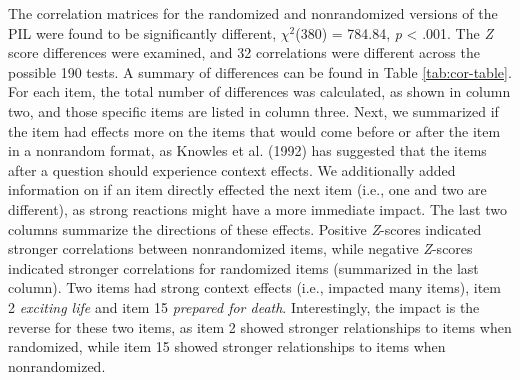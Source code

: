 \documentclass[english,man, mask]{apa6}
\theoremstyle{definition}
\theoremstyle{definition}
\theoremstyle{definition}
\theoremstyle{remark}
\begin{document}
The correlation matrices for the randomized and nonrandomized versions
of the PIL were found to be significantly different, \(\chi^2\)(380) =
784.84, \emph{p} \textless{} .001. The \emph{Z} score differences were
examined, and 32 correlations were different across the possible 190
tests. A summary of differences can be found in Table
\ref{tab:cor-table}. For each item, the total number of differences was
calculated, as shown in column two, and those specific items are listed
in column three. Next, we summarized if the item had effects more on the
items that would come before or after the item in a nonrandom format, as
Knowles et al. (1992) has suggested that the items after a question
should experience context effects. We additionally added information on
if an item directly effected the next item (i.e., one and two are
different), as strong reactions might have a more immediate impact. The
last two columns summarize the directions of these effects. Positive
\emph{Z}-scores indicated stronger correlations between nonrandomized
items, while negative \emph{Z}-scores indicated stronger correlations
for randomized items (summarized in the last column). Two items had
strong context effects (i.e., impacted many items), item 2
\emph{exciting life} and item 15 \emph{prepared for death}.
Interestingly, the impact is the reverse for these two items, as item 2
showed stronger relationships to items when randomized, while item 15
showed stronger relationships to items when nonrandomized.
\end{document}
